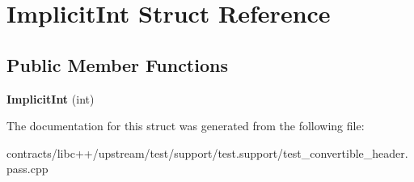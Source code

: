 \hypertarget{struct_implicit_int}{}\section{Implicit\+Int Struct Reference}
\label{struct_implicit_int}
\subsection*{Public Member Functions}
\begin{DoxyCompactItemize}
\item 
\mbox{\label{struct_implicit_int_adb84bf7570ee2f14c314da3dc28d1178}} 
{\bfseries Implicit\+Int} (int)
\end{DoxyCompactItemize}


The documentation for this struct was generated from the following file\+:\begin{DoxyCompactItemize}
\item 
contracts/libc++/upstream/test/support/test.\+support/test\+\_\+convertible\+\_\+header.\+pass.\+cpp\end{DoxyCompactItemize}
